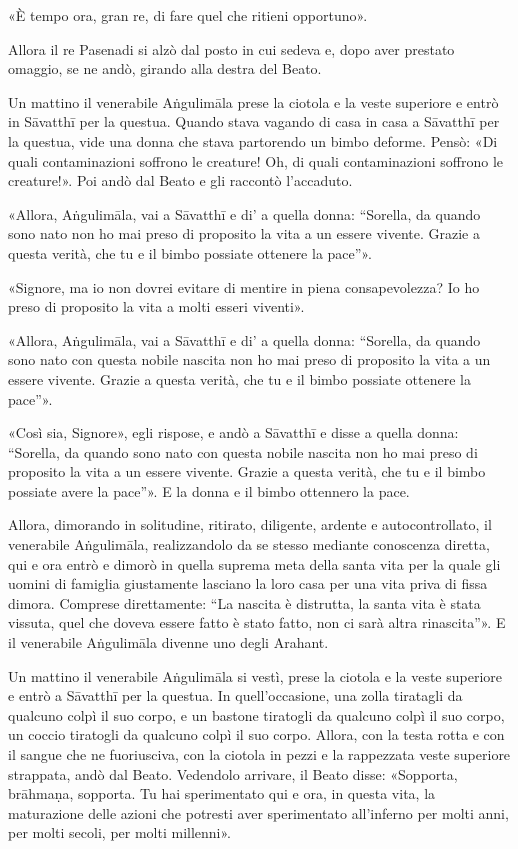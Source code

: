 «È tempo ora, gran re, di fare quel che ritieni opportuno».


Allora il re Pasenadi si alzò dal posto in cui sedeva e, dopo aver
prestato omaggio, se ne andò, girando alla destra del Beato.


Un mattino il venerabile Aṅgulimāla prese la ciotola e la veste
superiore e entrò in Sāvatthī per la questua. Quando stava vagando di
casa in casa a Sāvatthī per la questua, vide una donna che stava
partorendo un bimbo deforme. Pensò: «Di quali contaminazioni soffrono le
creature! Oh, di quali contaminazioni soffrono le creature!». Poi andò
dal Beato e gli raccontò l’accaduto.


«Allora, Aṅgulimāla, vai a Sāvatthī e di' a quella donna: “Sorella, da
quando sono nato non ho mai preso di proposito la vita a un essere
vivente. Grazie a questa verità, che tu e il bimbo possiate ottenere la
pace”».


«Signore, ma io non dovrei evitare di mentire in piena consapevolezza?
Io ho preso di proposito la vita a molti esseri viventi».


«Allora, Aṅgulimāla, vai a Sāvatthī e di' a quella donna: “Sorella, da
quando sono nato con questa nobile nascita non ho mai preso di proposito
la vita a un essere vivente. Grazie a questa verità, che tu e il bimbo
possiate ottenere la pace”».


«Così sia, Signore», egli rispose, e andò a Sāvatthī e disse a quella
donna: “Sorella, da quando sono nato con questa nobile nascita non ho
mai preso di proposito la vita a un essere vivente. Grazie a questa
verità, che tu e il bimbo possiate avere la pace”». E la donna e il
bimbo ottennero la pace.


Allora, dimorando in solitudine, ritirato, diligente, ardente e
autocontrollato, il venerabile Aṅgulimāla, realizzandolo da se stesso
mediante conoscenza diretta, qui e ora entrò e dimorò in quella suprema
meta della santa vita per la quale gli uomini di famiglia giustamente
lasciano la loro casa per una vita priva di fissa dimora. Comprese
direttamente: “La nascita è distrutta, la santa vita è stata vissuta,
quel che doveva essere fatto è stato fatto, non ci sarà altra
rinascita”». E il venerabile Aṅgulimāla divenne uno degli Arahant.


Un mattino il venerabile Aṅgulimāla si vestì, prese la ciotola e la
veste superiore e entrò a Sāvatthī per la questua. In quell’occasione,
una zolla tiratagli da qualcuno colpì il suo corpo, e un bastone
tiratogli da qualcuno colpì il suo corpo, un coccio tiratogli da
qualcuno colpì il suo corpo. Allora, con la testa rotta e con il sangue
che ne fuoriusciva, con la ciotola in pezzi e la rappezzata veste
superiore strappata, andò dal Beato. Vedendolo arrivare, il Beato disse:
«Sopporta, brāhmaṇa, sopporta. Tu hai sperimentato qui e ora, in questa
vita, la maturazione delle azioni che potresti aver sperimentato
all’inferno per molti anni, per molti secoli, per molti millenni».



